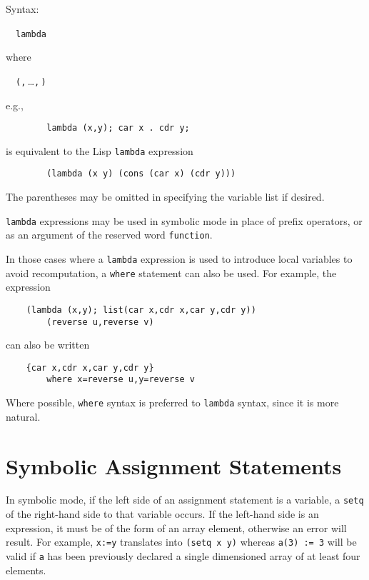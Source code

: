 Syntax:
\begin{syntax}
  \ \BNFprod\
    \texttt{lambda } 
\end{syntax}
 where
\begin{syntax}
  \ \BNFprod\ \texttt{(}\texttt{,}\,\dots\texttt{,}\,\texttt{)}
\end{syntax}
e.g.,
\begin{verbatim}
        lambda (x,y); car x . cdr y;
\end{verbatim}
is equivalent to the Lisp \texttt{lambda} expression
\begin{verbatim}
        (lambda (x y) (cons (car x) (cdr y)))
\end{verbatim}
The parentheses may be omitted in specifying the variable list if desired.

\texttt{lambda} expressions may be used in symbolic mode in place of prefix
operators, or as an argument of the reserved word \hypertarget{reserved:FUNCTION}{\texttt{function}}.

In those cases where a \texttt{lambda} expression is used to introduce local
variables to avoid recomputation, a \texttt{where} statement can also be
used.  For example, the expression
\begin{verbatim}
    (lambda (x,y); list(car x,cdr x,car y,cdr y))
        (reverse u,reverse v)
\end{verbatim}
can also be written
\begin{verbatim}
    {car x,cdr x,car y,cdr y}
        where x=reverse u,y=reverse v
\end{verbatim}
Where possible, \texttt{where} syntax is preferred to \texttt{lambda} syntax,
since it is more natural.

\section{Symbolic Assignment Statements}
\index{Symbolic mode!assignment}
\hypertarget{command:SETQ}{}

In symbolic mode, if the left side of an assignment statement is a
variable, a \texttt{setq} of the right-hand side to that variable occurs.  If
the left-hand side is an expression, it must be of the form of an array
element, otherwise an error will result.  For example, \texttt{x:=y}
translates into \texttt{(setq x y)} whereas \texttt{a(3) := 3} will be valid if
\texttt{a} has been previously declared a single dimensioned array of at
least four elements.

